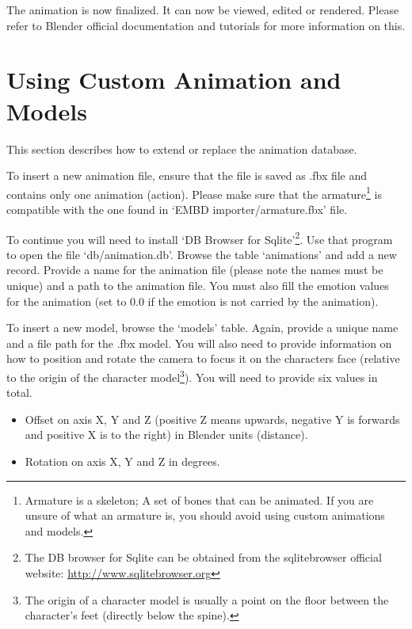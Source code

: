 \noindent The animation is now finalized. It can now be viewed, edited or rendered. Please refer to Blender official documentation and tutorials for more information on this.

\section{Using Custom Animation and Models}
This section describes how to extend or replace the animation database.

To insert a new animation file, ensure that the file is saved as .fbx file and contains only one animation (action). Please make sure that the armature\footnote{Armature is a skeleton; A set of bones that can be animated. If you are unsure of what an armature is, you should avoid using custom animations and models.} is compatible with the one found in `EMBD importer/armature.fbx' file.

To continue you will need to install `DB Browser for Sqlite'\footnote{The DB browser for Sqlite can be obtained from the sqlitebrowser official website:  \url{http://www.sqlitebrowser.org}}. Use that program to open the file `db/animation.db'. Browse the table `animations' and add a new record. Provide a name for the animation file (please note the names must be unique) and a path to the animation file. You must also fill the emotion values for the animation (set to 0.0 if the emotion is not carried by the animation).

To insert a new model, browse the `models' table. Again, provide a unique name and a file path for the .fbx model. You will also need to provide information on how to position and rotate the camera to focus it on the characters face (relative to the origin of the character model\footnote{The origin of a character model is usually a point on the floor between the character's feet (directly below the spine).}). You will need to provide six values in total.
\begin{itemize}
	\item Offset on axis X, Y and Z (positive Z means upwards, negative Y is forwards and positive X is to the right) in Blender units (distance).
	\item Rotation on axis X, Y and Z in degrees.
\end{itemize}

